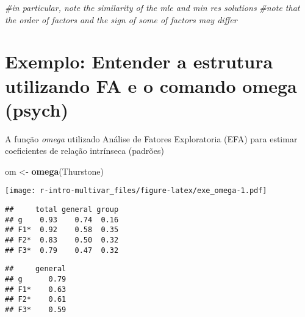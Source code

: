 \documentclass[]{book}
\newenvironment{Shaded}{\begin{snugshade}}{\end{snugshade}}
\newcommand{\KeywordTok}[1]{\textcolor[rgb]{0.13,0.29,0.53}{\textbf{{#1}}}}
\newcommand{\DecValTok}[1]{\textcolor[rgb]{0.00,0.00,0.81}{{#1}}}
\newcommand{\StringTok}[1]{\textcolor[rgb]{0.31,0.60,0.02}{{#1}}}
\newcommand{\CommentTok}[1]{\textcolor[rgb]{0.56,0.35,0.01}{\textit{{#1}}}}
\newcommand{\NormalTok}[1]{{#1}}
\begin{document}
\begin{Shaded}
\begin{Highlighting}[]
\CommentTok{#in particular, note the similarity of the mle and min res solutions}
\CommentTok{#note that the order of factors and the sign of some of factors may differ }
\end{Highlighting}
\end{Shaded}

\section{Exemplo: Entender a estrutura utilizando FA e o comando omega
(psych)}\label{exemplo-entender-a-estrutura-utilizando-fa-e-o-comando-omega-psych}

A função \emph{omega} utilizado Análise de Fatores Exploratoria (EFA)
para estimar coeficientes de relação intrínseca (padrões)

\begin{Shaded}
\begin{Highlighting}[]
\NormalTok{om <-}\StringTok{ }\KeywordTok{omega}\NormalTok{(Thurstone)}
\end{Highlighting}
\end{Shaded}

\texttt{[image: r-intro-multivar\_files/figure-latex/exe\_omega-1.pdf]}

\begin{Shaded}
\end{Shaded}

\begin{verbatim}
##     total general group
## g    0.93    0.74  0.16
## F1*  0.92    0.58  0.35
## F2*  0.83    0.50  0.32
## F3*  0.79    0.47  0.32
\end{verbatim}

\begin{Shaded}
\end{Shaded}

\begin{verbatim}
##     general
## g      0.79
## F1*    0.63
## F2*    0.61
## F3*    0.59
\end{verbatim}
\end{document}
